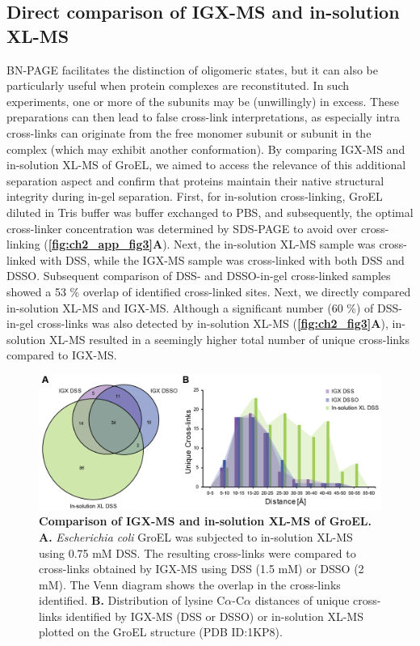 \subsection*{Direct comparison of IGX-MS and in-solution XL-MS}
BN-PAGE facilitates the distinction of oligomeric states, but it can also be particularly useful when protein complexes are reconstituted. In such experiments, one or more of the subunits may be (unwillingly) in excess. These preparations can then lead to false cross-link interpretations, as especially intra cross-links can originate from the free monomer subunit or subunit in the complex (which may exhibit another conformation). By comparing IGX-MS and in-solution XL-MS of GroEL, we aimed to access the relevance of this additional separation aspect and confirm that proteins maintain their native structural integrity during in-gel separation. First, for in-solution cross-linking, GroEL diluted in Tris buffer was buffer exchanged to PBS, and subsequently, the optimal cross-linker concentration was determined by SDS-PAGE to avoid over cross-linking (\textbf{\autoref{fig:ch2_app_fig3}A}). Next, the in-solution XL-MS sample was cross-linked with DSS, while the IGX-MS sample was cross-linked with both DSS and DSSO. Subsequent comparison of DSS- and DSSO-in-gel cross-linked samples showed a 53 \% overlap of identified cross-linked sites. Next, we directly compared in-solution XL-MS and IGX-MS. Although a significant number (60 \%) of DSS-in-gel cross-links was also detected by in-solution XL-MS (\textbf{\autoref{fig:ch2_fig3}A}), in-solution XL-MS resulted in a seemingly higher total number of unique cross-links compared to IGX-MS.
\begin{figure}[hb]
	\center
	\includegraphics[]{Chapter.2/Figures/Figure3.png}
	\caption{\textbf{Comparison of IGX-MS and in-solution XL-MS of GroEL.} \textbf{A.} \emph{Escherichia coli} GroEL was subjected to in-solution XL-MS using 0.75 mM DSS. The resulting cross-links were compared to cross-links obtained by IGX-MS using DSS (1.5 mM) or DSSO (2 mM). The Venn diagram shows the overlap in the cross-links identified. \textbf{B.} Distribution of lysine C$\alpha$-C$\alpha$ distances of unique cross-links identified by IGX-MS (DSS or DSSO) or in-solution XL-MS plotted on the GroEL structure (PDB ID:1KP8).}
	\label{fig:ch2_fig3}
\end{figure}\clearpage
